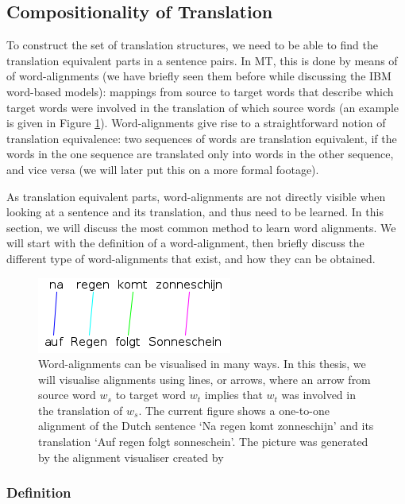 \documentclass{report}
\theoremstyle{definition}
\theoremstyle{plain}
\begin{document}
\subsection{Compositionality of Translation}
\label{sec:alignments}

To construct the set of translation structures, we need to be able to find the translation equivalent parts in a sentence pairs. In MT, this is done by means of of word-alignments (we have briefly seen them before while discussing the IBM word-based models): mappings from source to target words that describe which target words were involved in the translation of which source words (an example is given in Figure \ref{fig:alignment}). Word-alignments give rise to a straightforward notion of translation equivalence: two sequences of words are translation equivalent, if the words in the one sequence are translated only into words in the other sequence, and vice versa (we will later put this on a more formal footage).

As translation equivalent parts, word-alignments are not directly visible when looking at a sentence and its translation, and thus need to be learned. In this section, we will discuss the most common method to learn word alignments. We will start with the definition of a word-alignment, then briefly discuss the different type of word-alignments that exist, and how they can be obtained.

\begin{figure}[!ht]
\centering
\includegraphics[scale=0.6]{alignment.png}
\caption{Word-alignments can be visualised in many ways. In this thesis, we will visualise alignments using lines, or arrows, where an arrow from source word $w_s$ to target word $w_t$ implies that $w_t$ was involved in the translation of $w_s$. The current figure shows a one-to-one alignment of the Dutch sentence `Na regen komt zonneschijn' and its translation `Auf regen folgt sonneschein'. The picture was generated by the alignment visualiser created by \cite{maillette2010visualizing}}
\label{fig:alignment}
\end{figure}


\subsubsection{Definition}
\end{document}

